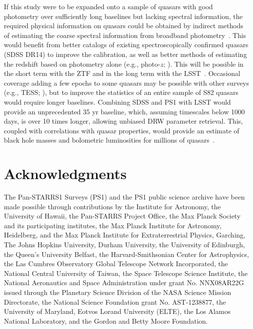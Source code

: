 \documentclass[twocolumn]{aastex62}
\begin{document}
If this study were to be expanded onto a sample of quasars with good photometry over sufficiently long baselines but lacking spectral information, the required physical information on quasars could be obtained by indirect methods of estimating the coarse spectral information from broadband photometry~\citep{kozlowski2015}. This would benefit from better catalogs of existing spectroscopically confirmed quasars (SDSS DR14) to improve the calibration, as well as better methods of estimating the redshift based on photometry alone (e.g., photo-$z$; \citealt{richards2015,yang2017,curran2019,jin2019}).  This will be possible in the short term with the ZTF \citep{bellm2019} and in the long term with the LSST~\citep{ivezic2019}. Occasional coverage adding a few epochs to some quasars may be possible with other surveys (e.g., TESS; \citealt{ricker2014}), but to improve the statistics of an entire sample of S82 quasars would require longer baselines. Combining SDSS and PS1 with LSST would provide an unprecedented 35 yr baseline, which, assuming timescales below 1000 days, is over 10 times longer, allowing unbiased DRW parameter retrieval. This, coupled with correlations with quasar properties, would provide an estimate of black hole masses and bolometric luminosities for millions of quasars~\citep{ivezic2019}. 


\section{Acknowledgments}

The Pan-STARRS1 Surveys (PS1) and the PS1 public science archive have been made possible through contributions by the Institute for Astronomy, the University of Hawaii, the Pan-STARRS Project Office, the Max Planck Society and its participating institutes, the Max Planck Institute for Astronomy, Heidelberg, and the Max Planck Institute for Extraterrestrial Physics, Garching, The Johns Hopkins University, Durham University, the University of Edinburgh, the Queen's University Belfast, the Harvard-Smithsonian Center for Astrophysics, the Las Cumbres Observatory Global Telescope Network Incorporated, the National Central University of Taiwan, the Space Telescope Science Institute, the National Aeronautics and Space Administration under grant No. NNX08AR22G issued through the Planetary Science Division of the NASA Science Mission Directorate, the National Science Foundation grant No. AST-1238877, the University of Maryland, Eotvos Lorand University (ELTE), the Los Alamos National Laboratory, and the Gordon and Betty Moore Foundation.
\end{document}
